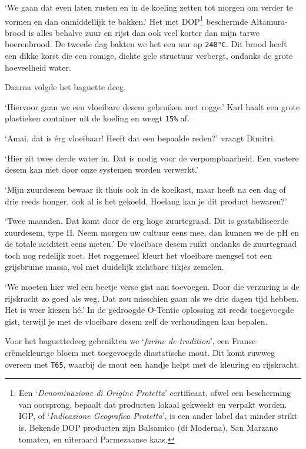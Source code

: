 \documentclass[
  11pt,
  dutch,
]{memoir}
\begin{document}
`We gaan dat even laten rusten en in de koeling zetten tot morgen om
verder te vormen en dan onmiddellijk te bakken.' Het met DOP\footnote{Een
  `\emph{Denominazione di Origine Protetta}' certificaat, ofwel een
  bescherming van oorsprong, bepaalt dat producten lokaal gekweekt en
  verpakt worden. IGP, of `\emph{Indicazione Geografica Protetta}', is
  een ander label dat minder strikt is. Bekende DOP producten zijn
  Balsamico (di Moderna), San Marzano tomaten, en uiteraard Parmezaanse
  kaas.} beschermde Altamura-brood is alles behalve zuur en rijst dan
ook veel korter dan mijn tarwe boerenbrood. De tweede dag bakten we het
een uur op \texttt{240°C}. Dit brood heeft een dikke korst die een
romige, dichte gele structuur verbergt, ondanks de grote hoeveelheid
water.

Daarna volgde het baguette deeg.

`Hiervoor gaan we een vloeibare desem gebruiken met rogge.' Karl haalt
een grote plastieken container uit de koeling en weegt \texttt{15\%} af.

`Amai, dat is érg vloeibaar! Heeft dat een bepaalde reden?' vraagt
Dimitri.

`Hier zit twee derde water in. Dat is nodig voor de verpompbaarheid. Een
vastere desem kan niet door onze systemen worden verwerkt.'

`Mijn zuurdesem bewaar ik thuis ook in de koelkast, maar heeft na een
dag of drie reeds honger, ook al is het gekoeld. Hoelang kan je dit
product bewaren?'

`Twee maanden. Dat komt door de erg hoge zuurtegraad. Dit is
gestabiliseerde zuurdesem, type II. Neem morgen uw cultuur eens mee, dan
kunnen we de pH en de totale aciditeit eens meten.' De vloeibare desem
ruikt ondanks de zuurtegraad toch nog redelijk zoet. Het roggemeel
kleurt het vloeibare mengsel tot een grijsbruine massa, vol met
duidelijk zichtbare tikjes zemelen.

`We moeten hier wel een beetje verse gist aan toevoegen. Door die
verzuring is de rijskracht zo goed als weg. Dat zou misschien gaan als
we drie dagen tijd hebben. Het is weer kiezen hé.' In de gedroogde
O-Tentic oplossing zit reeds toegevoegde gist, terwijl je met de
vloeibare desem zelf de verhoudingen kan bepalen.

Voor het baguettedeeg gebruikten we `\emph{farine de tradition}', een
Franse crèmekleurige bloem met toegevoegde diastatische mout. Dit komt
ruwweg overeen met \texttt{T65}, waarbij de mout een handje helpt met de
kleuring en rijskracht.
\end{document}

